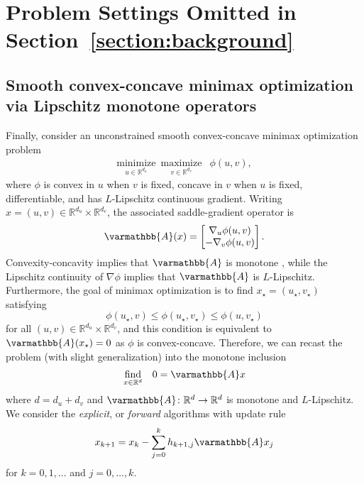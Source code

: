 \documentclass{article}
\theoremstyle{definition}
\theoremstyle{plain}
\newcommand{\reals}{\mathbb{R}}
\newcommand{\opA}{{\varmathbb{A}}}
\begin{document}
\appendix

\section{Problem Settings Omitted in Section~\ref{section:background}}


\subsection{Smooth convex-concave minimax optimization via Lipschitz monotone operators}
\label{section:minimax-optimization}

Finally, consider an unconstrained smooth convex-concave minimax optimization problem
\[
\begin{array}{cc}
    \underset{u\in\reals^{d_u}}{\text{minimize}}\,\,\,
    \underset{v\in\reals^{d_v}}{\text{maximize}}
    & \phi(u,v),
\end{array}
\]
where $\phi$ is convex in $u$ when $v$ is fixed, concave in $v$ when $u$ is fixed, differentiable, and has $L$-Lipschitz continuous gradient.
Writing $x=(u,v)\in\reals^{d_u} \times \reals^{d_v}$, the associated saddle-gradient operator is
\begin{align}
\label{eqn:saddle-operator}
    \opA(x)
    =
    \begin{bmatrix}
        \nabla_u\phi(u,v)\\
        -\nabla_v\phi(u,v)
    \end{bmatrix}.
\end{align}
Convexity-concavity implies that $\opA$ is monotone \cite{rockafellarMonotoneOperatorsAssociated1970}, while the Lipschitz continuity of $\nabla\phi$ implies that $\opA$ is $L$-Lipschitz.
Furthermore, the goal of minimax optimization is to find $x_\star = (u_\star, v_\star)$ satisfying
\[
    \phi(u_\star, v) \le \phi(u_\star, v_\star) \le \phi(u, v_\star)
\]
for all $(u,v) \in \reals^{d_u} \times \reals^{d_v}$, and this condition is equivalent to $\opA(x_\star) = 0$ as $\phi$ is convex-concave.
Therefore, we can recast the problem (with slight generalization) into the monotone inclusion
\[
\begin{array}{cc}
    \underset{x\in\reals^{d}}{\text{find}} & 0=\opA x 
\end{array}
\]
where $d = d_u+d_v$ and $\opA\colon \reals^d \to \reals^d$ is monotone and $L$-Lipschitz.
We consider the \textit{explicit}, or \textit{forward} algorithms with update rule
\[
    x_{k+1} = x_k - \sum_{j=0}^k h_{k+1,j} \opA x_j 
\]
for $k=0,1,\dots$ and $j=0,\dots,k$.
\end{document}
